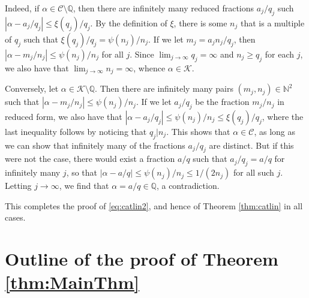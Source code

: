 \documentclass[12pt]{amsart}
\numberwithin{equation}{section}
\theoremstyle{definition}
\theoremstyle{remark}
\newcommand{\N}{\mathbb{N}}
\newcommand{\Q}{\mathbb{Q}}
\newcommand{\CC}{\mathcal{C}}
\newcommand{\CK}{\mathcal{K}}
\renewcommand{\le}{\leqslant}
\renewcommand{\ge}{\geqslant}
\begin{document}
Indeed, if $\alpha \in \CC\setminus\Q$, then there are infinitely many reduced fractions $a_j/q_j$ such $|\alpha-a_j/q_j|\le\xi(q_j)/q_j$. By the definition of $\xi$, there is some $n_j$ that is a multiple of $q_j$ such that $\xi(q_j)/q_j=\psi(n_j)/n_j$. If we let $m_j=a_j n_j/q_j$, then $|\alpha-m_j/n_j|\le \psi(n_j)/n_j$ for all $j$. Since $\lim_{j\to\infty}q_j=\infty$ and $n_j\ge q_j$ for each $j$, we also have that $\lim_{j\to\infty}n_j=\infty$,  whence $\alpha \in \CK$. 

Conversely, let $\alpha \in \CK\setminus\Q$. Then there are infinitely many pairs $(m_j,n_j)\in\N^2$ such that $|\alpha-m_j/n_j|\le\psi(n_j)/n_j$. If we let $a_j/q_j$ be the fraction $m_j/n_j$ in reduced form, we also have that $|\alpha-a_j/q_j|\le\psi(n_j)/n_j\le \xi(q_j)/q_j$, where the last inequality follows by noticing that $q_j|n_j$. This shows that $\alpha\in \CC$, as long as we can show that infinitely many of the fractions $a_j/q_j$ are distinct. But if this were not the case, there would exist a fraction $a/q$ such that $a_j/q_j=a/q$ for infinitely many $j$, so that $|\alpha-a/q|\le \psi(n_j)/n_j\le1/(2n_j)$ for all such $j$. Letting $j\to\infty$, we find that $\alpha=a/q\in\Q$, a contradiction. 

This completes the proof of \eqref{eq:catlin2}, and hence of Theorem \ref{thm:catlin} in all cases.








\section{Outline of the proof of Theorem \ref{thm:MainThm}}\label{sec:outline}
\end{document}
